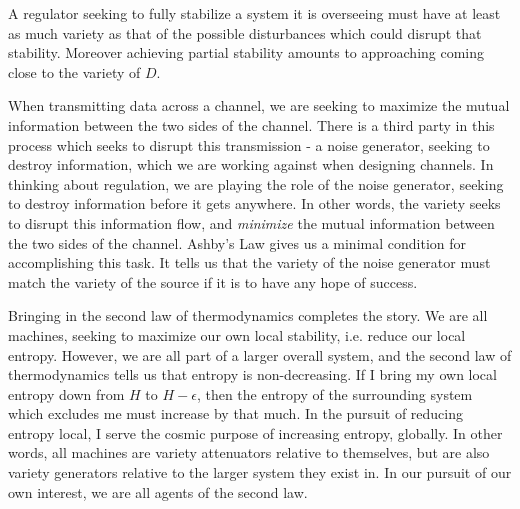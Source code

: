 \begin{theorem}
	A regulator seeking to fully stabilize a system it is overseeing must have at least as much variety as that of the possible disturbances which could disrupt that stability. Moreover achieving partial stability amounts to approaching coming close to the variety of $D$.
\end{theorem}
When transmitting data across a channel, we are seeking to maximize the mutual information between the two sides of the channel. There is a third party in this process which seeks to disrupt this transmission - a noise generator, seeking to destroy information, which we are working against when designing channels. In thinking about regulation, we are playing the role of the noise generator, seeking to destroy information before it gets anywhere. In other words, the variety seeks to disrupt this information flow, and \emph{minimize} the mutual information between the two sides of the channel. Ashby's Law gives us a minimal condition for accomplishing this task. It tells us that the variety of the noise generator must match the variety of the source if it is to have any hope of success. \par 
Bringing in the second law of thermodynamics completes the story. We are all machines, seeking to maximize our own local stability, i.e. reduce our local entropy. However, we are all part of a larger overall system, and the second law of thermodynamics tells us that entropy is non-decreasing. If I bring my own local entropy down from $H$ to $H-\epsilon$, then the entropy of the surrounding system which excludes me must increase by that much. In the pursuit of reducing entropy local, I serve the cosmic purpose of increasing entropy, globally. In other words, all machines are variety attenuators relative to themselves, but are also variety generators relative to the larger system they exist in. In our pursuit of our own interest, we are all agents of the second law. 

